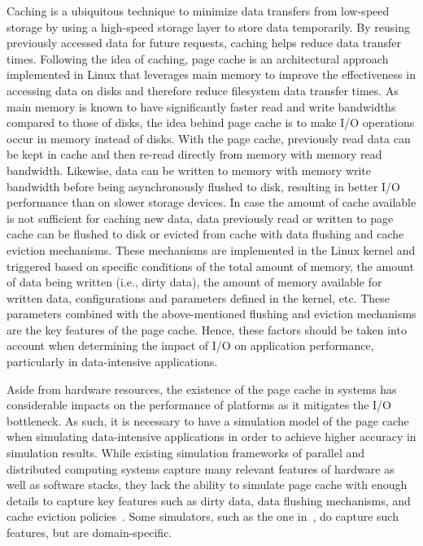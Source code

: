 Caching is a ubiquitous technique to minimize data transfers from 
low-speed storage by using a high-speed storage layer to store data 
temporarily. By reusing previously accessed data for future requests, 
caching helps reduce data transfer times. 
Following the idea of caching, page cache is an architectural approach 
implemented in Linux that leverages main memory to improve the 
effectiveness in accessing data on disks and therefore reduce filesystem data transfer times.
As main memory is known to have significantly faster read and write bandwidths 
compared to those of disks, the idea behind page cache is to make I/O operations 
occur in memory instead of disks.
With the page cache, previously read data can be kept in cache and then re-read 
directly from memory with memory read bandwidth. 
Likewise, data can be written to memory with memory write bandwidth 
before being asynchronously flushed to disk, resulting in better I/O performance 
than on slower storage devices. 
In case the amount of cache available is not sufficient for caching new data, 
data previously read or written to page cache can be flushed to disk or 
evicted from cache with data flushing and cache eviction mechanisms. 
These mechanisms are implemented in the Linux kernel and triggered 
based on specific conditions of the total amount of memory, the amount of data 
being written (i.e., dirty data), the amount of memory available for written data, 
configurations and parameters defined in the kernel, etc.
These parameters combined with the above-mentioned flushing and eviction 
mechanisms are the key features of the page cache. 
Hence, these factors should be taken into account when determining the impact 
of I/O on application performance, particularly in data-intensive applications.

Aside from hardware resources, the existence of the page cache in systems has 
considerable impacts on the performance of platforms as it mitigates the I/O 
bottleneck.
As such, it is necessary to have a simulation model of the page cache when 
simulating data-intensive applications in order to achieve higher accuracy  
in simulation results.
While existing simulation frameworks of parallel and distributed computing
systems capture many relevant features of hardware as well as software stacks, 
they lack the ability to simulate page cache with enough details to capture 
key features such as dirty data, data flushing mechanisms, and cache eviction 
policies~\cite{nunez2012simcan,nunez2012icancloud}. 
Some simulators, such as the one in~\cite{xu2018saving}, do capture such 
features, but are domain-specific. 

